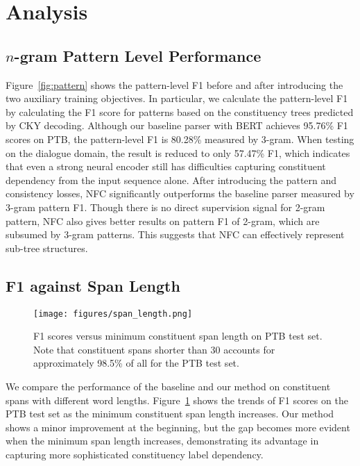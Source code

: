 \documentclass[11pt]{article}
\begin{document}
 








\section{Analysis}

\subsection{$n$-gram Pattern Level Performance}


Figure~\ref{fig:pattern} shows the pattern-level F1 before and after introducing the two auxiliary training objectives. In particular, we calculate the pattern-level F1 by calculating the F1 score for patterns based on the constituency trees predicted by CKY decoding. Although our baseline parser with BERT achieves 95.76\% F1 scores on PTB, the pattern-level F1 is 80.28\% measured by 3-gram. When testing on the dialogue domain, the result is reduced to only 57.47\% F1, which indicates that even a strong neural encoder still has difficulties capturing constituent dependency from the input sequence alone. 
After introducing the pattern and consistency losses, NFC significantly outperforms the baseline parser measured by 3-gram pattern F1. 
Though there is no direct supervision signal for 2-gram pattern, NFC also gives better results on pattern F1 of 2-gram, which are subsumed by 3-gram patterns.
This suggests that NFC can effectively represent sub-tree structures.

\subsection{F1 against Span Length}

\begin{figure}[t!]
    \centering
    \texttt{[image: figures/span\_length.png]}
    \caption{F1 scores versus minimum constituent span length on PTB test set. Note that constituent spans shorter than 30 accounts for approximately 98.5\% of all for the PTB test set. }
    \label{fig:span_length}
    \vspace{-0.3cm}
\end{figure}

 


We compare the performance of the baseline and our method on constituent spans with different word lengths. 
Figure~\ref{fig:span_length} shows the trends of F1 scores on the PTB test set as the minimum constituent span length increases. 
Our method shows a minor improvement at the beginning, but the gap becomes more evident when the minimum span length increases, demonstrating its advantage in capturing
more sophisticated constituency label dependency.
\end{document}
